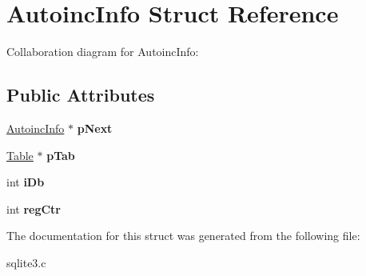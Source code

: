 \hypertarget{structAutoincInfo}{}\section{Autoinc\+Info Struct Reference}
\label{structAutoincInfo}


Collaboration diagram for Autoinc\+Info\+:
\subsection*{Public Attributes}
\begin{DoxyCompactItemize}
\item 
\hyperlink{structAutoincInfo}{Autoinc\+Info} $\ast$ {\bfseries p\+Next}\hypertarget{structAutoincInfo_aa77fb076beea013c25df4e49dba4b6f6}{}\label{structAutoincInfo_aa77fb076beea013c25df4e49dba4b6f6}

\item 
\hyperlink{structTable}{Table} $\ast$ {\bfseries p\+Tab}\hypertarget{structAutoincInfo_a0cf785b0cbaddb4215a8408f8e13075e}{}\label{structAutoincInfo_a0cf785b0cbaddb4215a8408f8e13075e}

\item 
int {\bfseries i\+Db}\hypertarget{structAutoincInfo_ae7234e0916b11ef97377bdfd6c7c4568}{}\label{structAutoincInfo_ae7234e0916b11ef97377bdfd6c7c4568}

\item 
int {\bfseries reg\+Ctr}\hypertarget{structAutoincInfo_af180977ee7dcc8cab862185692f57cc5}{}\label{structAutoincInfo_af180977ee7dcc8cab862185692f57cc5}

\end{DoxyCompactItemize}


The documentation for this struct was generated from the following file\+:\begin{DoxyCompactItemize}
\item 
sqlite3.\+c\end{DoxyCompactItemize}
